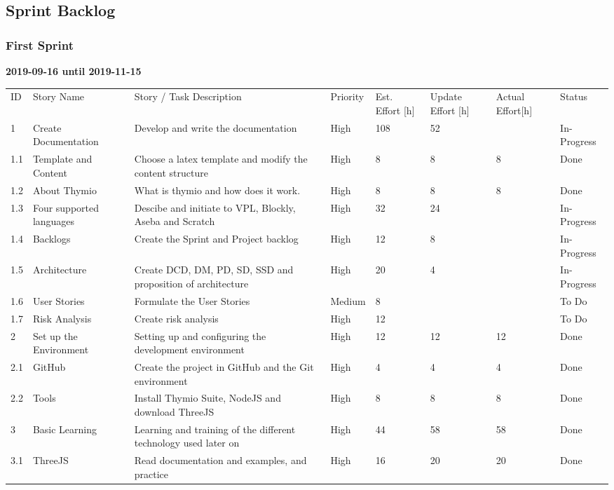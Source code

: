 \documentclass{scrartcl}
\begin{document}
\subsection{Sprint Backlog}
\subsubsection{First Sprint}
\textbf{2019-09-16 until 2019-11-15}
\begin{longtable}{p{5mm}|p{2cm}|p{4cm}|p{1cm}|p{1cm}|p{1cm}|p{1cm}|p{1cm}}
  ID                     & Story Name & Story / Task Description & Priority & Est. Effort {[}h{]} & Update Effort {[}h{]} & Actual Effort{[}h{]} & Status                \\ 
  1 & Create Documentation & Develop and write the documentation & High & 108 & 52 &  & In-Progress \\ 
  1.1 & Template and Content & Choose a latex template and modify the content structure & High & 8 & 8 & 8 & Done \\ 
  1.2 & About Thymio & What is thymio and how does it work. & High & 8 & 8 & 8 & Done \\ 
  1.3 & Four supported languages & Descibe and initiate to VPL, Blockly, Aseba and Scratch & High & 32 & 24 &  & In-Progress \\ 
  1.4 & Backlogs & Create the Sprint and Project backlog & High & 12 & 8 &  & In-Progress \\ 
  1.5 & Architecture & Create DCD, DM, PD, SD, SSD and proposition of architecture & High & 20 & 4 &  & In-Progress \\
  1.6 & User Stories & Formulate the User Stories & Medium & 8 &  &  & To Do \\ 
  1.7 & Risk Analysis & Create risk analysis & High & 12 &  &  & To Do \\ 
  2 & Set up the Environment & Setting up and configuring the development environment & High & 12 & 12 & 12 & Done \\ 
  2.1 & GitHub & Create the project in GitHub and the Git environment & High & 4 & 4 & 4 & Done \\ 
  2.2 & Tools & Install Thymio Suite, NodeJS and download ThreeJS & High & 8 & 8 & 8 & Done \\ 
  3 & Basic Learning & Learning and training of the different technology used later on & High & 44 & 58 & 58 & Done \\
  3.1 & ThreeJS & Read documentation and examples, and practice & High & 16 & 20 & 20 & Done \\ 

\end{longtable}
\end{document}
